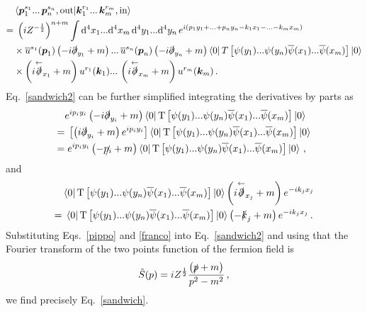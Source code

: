 \begin{sol}
    \begin{equation}
    \label{sandwich2}
    \begin{split}
        &\bra{\boldsymbol{p}_1^{s_1} ...\, \boldsymbol{p}_n^{s_n}, {\rm out}} \ket{\boldsymbol{k}_1^{r_1} ...\, \boldsymbol{k}_m^{r_m}, {\rm in}} \\
        = & \;\left(i Z^{-\frac{1}{2}}\right)^{n+m} \int {\rm d}^4x_1 ... {\rm d}^4x_m \, {\rm d}^4y_1 ... {\rm d}^4y_n \,
        e^{i(p_1 y_1 + ... + p_n y_n - k_1 x_1 - ... - k_m x_m)} \\ 
        & \times \overline{u}^{s_1}(\boldsymbol{p}_1) \left(-i \slashed{\partial}_{y_1} + m\right) ...\, \overline{u}^{s_n}(\boldsymbol{p}_n) \left(-i \slashed{\partial}_{y_n} + m\right) \bra{0} T\left[ \psi(y_1) ... \psi(y_n) \overline{\psi}(x_1) ... \overline{\psi}(x_m) \right]\ket{0} \\
        & \times \left(i \overset{\leftarrow}{\slashed{\partial}}_{x_1} + m\right) u^{r_1}(\boldsymbol{k}_1) ...\, \left(i \overset{\leftarrow}{\slashed{\partial}}_{x_m} + m\right) u^{r_m}(\boldsymbol{k}_m) \,.
        \end{split}
    \end{equation}
    Eq.~\eqref{sandwich2} can be further simplified integrating the derivatives by parts as
    \begin{align}
        & e^{i p_i y_i} \left( -i \slashed{\partial}_{y_i} + m\right) \bra{0} \mathbf{\rm T} \left[ \psi(y_1) ... \psi(y_n) \overline{\psi}(x_1) ... \overline{\psi}(x_m) \right]\ket{0}\notag \\
        = &\; \left[ \left( i \slashed{\partial}_{y_i} + m\right) e^{i p_i y_i} \right]  \bra{0} \mathbf{\rm T} \left[ \psi(y_1) ... \psi(y_n) \overline{\psi}(x_1) ... \overline{\psi}(x_m) \right]\ket{0} \notag \\
        = &\; e^{i p_i y_i} \left( - \slashed{p_i} + m \right) \bra{0} \mathbf{\rm T} \left[ \psi(y_1) ... \psi(y_n) \overline{\psi}(x_1) ... \overline{\psi}(x_m) \right]\ket{0} \,, \label{pippo}
    \end{align}
    and
    \begin{align}
        &\bra{0} \mathbf{\rm T} \left[ \psi(y_1) ... \psi(y_n) \overline{\psi}(x_1) ... \overline{\psi}(x_m) \right]\ket{0} \left( i \overset{\leftarrow}{\slashed{\partial}}_{x_j} + m\right) e^{-i k_j x_j} \notag \\
        = &\; \bra{0} \mathbf{\rm T} \left[ \psi(y_1) ... \psi(y_n) \overline{\psi}(x_1) ... \overline{\psi}(x_m) \right]\ket{0} \left( - \slashed{k}_j + m \right)e^{-i k_j x_j} \,. \label{franco}
    \end{align}
    Substituting Eqs.~\eqref{pippo} and \eqref{franco} into Eq.~\eqref{sandwich2} and using that the Fourier transform of the two points function of the fermion field is
    \begin{equation}
        \tilde{S}(p) = i Z^{\frac{1}{2}} \frac{\left( \slashed{p} + m\right)}{p^2 - m^2} \,,
    \end{equation}
    we find precisely Eq.~\eqref{sandwich}.


\end{sol}
